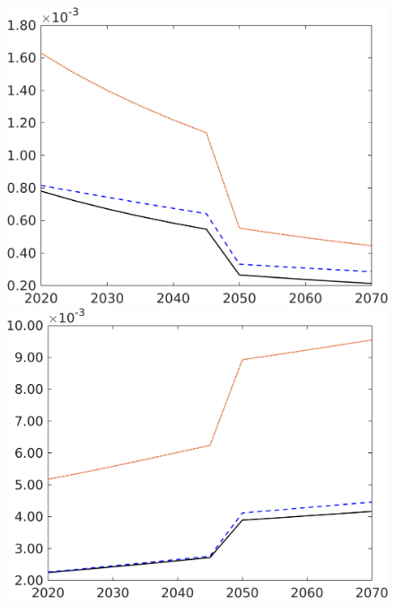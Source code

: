 \begin{figure}[h!!]
\begin{minipage}[]{0.32\textwidth}
	\end{minipage}
	\begin{minipage}[]{0.32\textwidth}
		\includegraphics[width=1\textwidth]{../../codding_model/own_basedOnFried/optimalPol_190722_tidiedUp/figures/all_10Aout22/CountMod1_target_Lf_regime3_spillover0_sep1_extern0_PV1_etaa0.79_lgd0.png}
	\end{minipage}
\begin{minipage}[]{0.32\textwidth}
	\includegraphics[width=1\textwidth]{../../codding_model/own_basedOnFried/optimalPol_190722_tidiedUp/figures/all_10Aout22/CountMod1_target_Lg_regime3_spillover0_sep1_extern0_PV1_etaa0.79_lgd0.png}

\end{minipage}
\end{figure}
